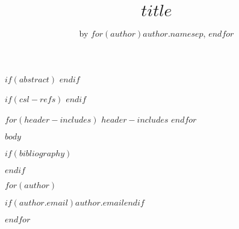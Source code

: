 \title{$title$}
\author{by $for(author)$$author.name$$sep$, $endfor$}

\maketitle

$if(abstract)$
$endif$

$if(csl-refs)$
\newlength{\cslhangindent}
\setlength{\cslhangindent}{1.5em}
\newenvironment{cslreferences}%
  {$if(csl-hanging-indent)$\setlength{\parindent}{0pt}%
  \everypar{\setlength{\hangindent}{\cslhangindent}}\ignorespaces$endif$}%
  {\par}
$endif$

$for(header-includes)$
$header-includes$
$endfor$

$body$

$if(bibliography)$

$endif$

$for(author)$
\address{%
$author.name$\\
$author.affiliation$\\
$for(author.address)$$author.address$$sep$\\ $endfor$\\
}
$if(author.email)$$author.email$$endif$

$endfor$
